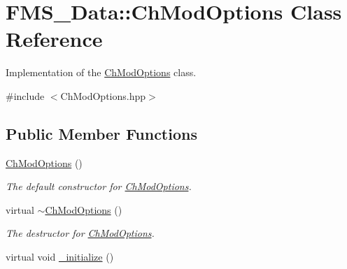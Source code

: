 \hypertarget{classFMS__Data_1_1ChModOptions}{
\section{FMS\_\-Data::ChModOptions Class Reference}
\label{classFMS__Data_1_1ChModOptions}
}


Implementation of the \hyperlink{classFMS__Data_1_1ChModOptions}{ChModOptions} class.  




{\ttfamily \#include $<$ChModOptions.hpp$>$}

\subsection*{Public Member Functions}
\begin{DoxyCompactItemize}
\item 
\hypertarget{classFMS__Data_1_1ChModOptions_aa8c85ee2a014a378aa7f86d762954af4}{
\hyperlink{classFMS__Data_1_1ChModOptions_aa8c85ee2a014a378aa7f86d762954af4}{ChModOptions} ()}
\label{classFMS__Data_1_1ChModOptions_aa8c85ee2a014a378aa7f86d762954af4}

\begin{DoxyCompactList}\small\item\em The default constructor for \hyperlink{classFMS__Data_1_1ChModOptions}{ChModOptions}. \item\end{DoxyCompactList}\item 
\hypertarget{classFMS__Data_1_1ChModOptions_ab17b539d0306c84505f2a0c0f7e127cc}{
virtual \hyperlink{classFMS__Data_1_1ChModOptions_ab17b539d0306c84505f2a0c0f7e127cc}{$\sim$ChModOptions} ()}
\label{classFMS__Data_1_1ChModOptions_ab17b539d0306c84505f2a0c0f7e127cc}

\begin{DoxyCompactList}\small\item\em The destructor for \hyperlink{classFMS__Data_1_1ChModOptions}{ChModOptions}. \item\end{DoxyCompactList}\item 
\hypertarget{classFMS__Data_1_1ChModOptions_a27cdbcad93874db722eb30aee1b634a0}{
virtual void \hyperlink{classFMS__Data_1_1ChModOptions_a27cdbcad93874db722eb30aee1b634a0}{\_\-initialize} ()}
\label{classFMS__Data_1_1ChModOptions_a27cdbcad93874db722eb30aee1b634a0}


\end{DoxyCompactItemize}

